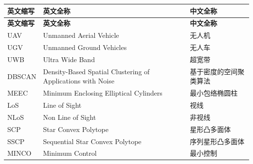 \cleardoublepage
{}
\begin{center}
    \begin{longtable}{m{2cm}m{8cm}m{5cm}}
        \toprule
        \textbf{英文缩写}&\textbf{英文全称}&\textbf{中文全称}\\
        \midrule
        \endfirsthead
        \toprule
        \textbf{英文缩写}&\textbf{英文全称}&\textbf{中文全称}\\
        \midrule
        \endhead 
        \bottomrule
        \endfoot
        \bottomrule
        \endlastfoot
        UAV&Unmanned Aerial Vehicle&无人机\\
        UGV&Unmanned Ground Vehicles&无人车\\
        UWB&Ultra Wide Band&超宽带\\
        DBSCAN&Density-Based Spatial Clustering of Applications with Noise&基于密度的空间聚类算法\\
        MEEC&Minimum Enclosing Elliptical Cylinders&最小包络椭圆柱\\
        LoS&Line of Sight&视线\\
        NLoS&Non Line of Sight&非视线\\
        SCP&Star Convex Polytope&星形凸多面体\\
        SSCP&Sequential Star Convex Polytope&序列星形凸多面体\\
        MINCO&Minimum Control&最小控制\\
	\end{longtable}
\end{center}